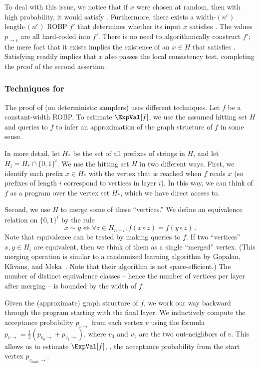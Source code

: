 To deal with this issue, we notice that if $x$ were chosen at random, then with high probability, it would satisfy . Furthermore, there exists a width-$(n^c)$ length-$(n^c)$ ROBP $f'$ that determines whether its input $x$ satisfies . The values $p_{\to v}$ are all hard-coded into $f'$. There is no need to algorithmically construct $f'$; the mere fact that it exists implies the existence of an $x \in H$ that satisfies . Satisfying  readily implies that $x$ also passes the local consistency test, completing the proof of the second assertion.

\subsubsection{Techniques for } \label{sec:const-width-techniques}
The proof of  (on deterministic samplers) uses different techniques. Let $f$ be a constant-width ROBP. To estimate $\ExpVal[f]$, we use the assumed hitting set $H$ and queries to $f$ to infer an approximation of the graph structure of $f$ in some sense.

In more detail, let $H_*$ be the set of all prefixes of strings in $H$, and let $H_i = H_* \cap \{0, 1\}^i$. We use the hitting set $H$ in two different ways. First, we identify each prefix $x \in H_*$ with the vertex that is reached when $f$ reads $x$ (so prefixes of length $i$ correspond to vertices in layer $i$). In this way, we can think of $f$ as a program over the vertex set $H_*$, which we have direct access to.

Second, we use $H$ to merge some of these ``vertices.'' We define an equivalence relation on $\{0, 1\}^i$ by the rule
\[
x \sim y \iff \forall z \in H_{n - i}, f(x \circ z) = f(y \circ z)\,.
\]
Note that equivalence can be tested by making queries to $f$. If two ``vertices'' $x, y \in H_i$ are equivalent, then we think of them as a single ``merged'' vertex. (This merging operation is similar to a randomized learning algorithm by Gopalan, Klivans, and Meka~\cite{GKM12}. Note that their algorithm is not space-efficient.) The number of distinct equivalence classes -- hence the number of vertices per layer after merging -- is bounded by %
the width of $f$. %

Given the (approximate) graph structure of $f$, we work our way backward through the program starting with the final layer. We inductively compute the acceptance probability $p_{v \to}$ from each vertex $v$ using the formula $p_{v \to} = \frac{1}{2} (p_{v_0 \to} + p_{v_1 \to})$, where $v_0$ and $v_1$ are the two out-neighbors of $v$. This allows us to estimate $\ExpVal[f]$, \ie, the acceptance probability from the start vertex $p_{v_{\text{start}} \to}$.

